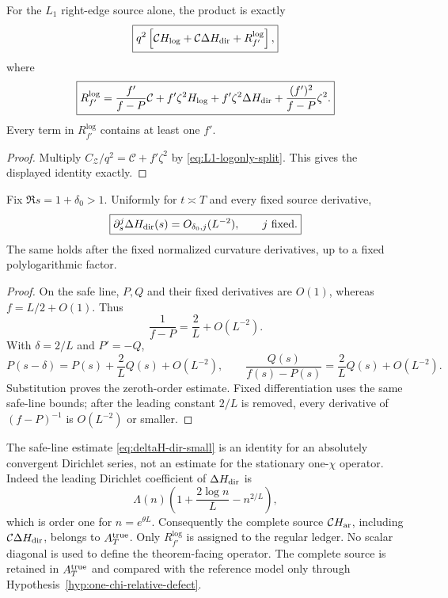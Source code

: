 \begin{lemma}
\label{lem:logonly-fprime-separation}
For the $L_1$ right-edge source alone, the product is exactly
\begin{equation}
\boxed{
q^2\left[\mathcal C H_{\log}
 +\mathcal C\Delta H_{\rm dir}
 +R_{f'}^{\log}\right],
}
\label{eq:logonly-product-split}
\end{equation}
where
\begin{equation}
\boxed{
R_{f'}^{\log}
=\frac{f'}{f-P}\mathcal C
 +f'\zeta^2H_{\log}
 +f'\zeta^2\Delta H_{\rm dir}
 +\frac{(f')^2}{f-P}\zeta^2.
}
\label{eq:logonly-fprime-source}
\end{equation}
Every term in $R_{f'}^{\log}$ contains at least one $f'$.
\end{lemma}

\begin{proof}
Multiply
$C_{\mathscr Z}/q^2=\mathcal C+f'\zeta^2$ by
\eqref{eq:L1-logonly-split}.  This gives the displayed identity exactly.
\end{proof}

\begin{lemma}
\label{lem:deltaH-dir-small}
Fix $\Re s=1+\delta_0>1$. Uniformly for $t\asymp T$ and every fixed source
derivative,
\begin{equation}
\boxed{
\partial_s^j\Delta H_{\rm dir}(s)=O_{\delta_0,j}(L^{-2}),
\qquad j\ \text{fixed}.
}
\label{eq:deltaH-dir-small}
\end{equation}
The same holds after the fixed normalized curvature derivatives, up to a fixed
polylogarithmic factor.
\end{lemma}

\begin{proof}
On the safe line, $P,Q$ and their fixed derivatives are $O(1)$, whereas
$f=L/2+O(1)$. Thus
\[
\frac1{f-P}=\frac2L+O(L^{-2}).
\]
With $\delta=2/L$ and $P'=-Q$,
\[
P(s-\delta)=P(s)+\frac2LQ(s)+O(L^{-2}),
\qquad
\frac{Q(s)}{f(s)-P(s)}=\frac2LQ(s)+O(L^{-2}).
\]
Substitution proves the zeroth-order estimate. Fixed differentiation uses the
same safe-line bounds; after the leading constant $2/L$ is removed, every
derivative of $(f-P)^{-1}$ is $O(L^{-2})$ or smaller.
\end{proof}

The safe-line estimate \eqref{eq:deltaH-dir-small} is an identity for an
absolutely convergent Dirichlet series, not an estimate for the stationary
one-$\chi$ operator.  Indeed the leading Dirichlet coefficient of
$\Delta H_{\rm dir}$ is
\begin{equation}
\Lambda(n)\left(1+\frac{2\log n}{L}-n^{2/L}\right),
\label{eq:direct-residual-coefficient-warning}
\end{equation}
which is order one for $n=e^{\theta L}$.  Consequently the complete source
$\mathcal C H_{\rm ar}$, including $\mathcal C\Delta H_{\rm dir}$, belongs to
$A_T^{\rm true}$.  Only $R_{f'}^{\log}$ is assigned to the regular ledger.
No scalar diagonal is used to define the theorem-facing operator.  The complete
source is retained in $A_T^{\rm true}$ and compared with the reference model
only through Hypothesis~\ref{hyp:one-chi-relative-defect}.
